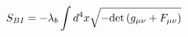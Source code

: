 \begin{equation}
S_{BI}=-\lambda_b \int{d^4x \sqrt{-{\rm det}\left(g_{\mu \nu}+F_{\mu \nu}\right)}}
\label{bi}
\end{equation}

